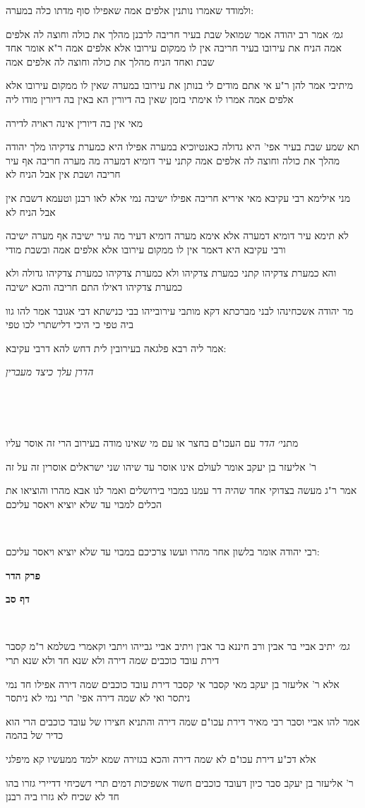 \documentclass[12pt, openany]{book}
\newcommand{\sethebfont}{
\fontsize{10.5pt}{21.0pt} \selectfont
}
\newcommand{\textblock}[1]{
{\sethebfont #1\\}	
}
\newcommand{\chapname}{}
\newcommand{\sectname}{}
\newcommand{\newchap}[1]{
	\addcontentsline{toc}{chapter}{#1}
	\renewcommand{\chapname}{#1}
		\begin{center}
			\textbf{%
\fontsize{16pt}{16pt}\selectfont
				#1}
		\end{center}
}
\newcommand{\newsection}[1]{
	\addcontentsline{toc}{section}{#1}
	\renewcommand{\sectname}{#1}	
	\vspace{-\baselineskip}
	\begin{center}
		\textbf{%
\fontsize{16pt}{16pt}\selectfont
			#1}
	\end{center}
	\vspace{-\baselineskip}
	\nopagebreak
}
\begin{document}
\textblock{ולמודד שאמרו נותנין אלפים אמה שאפילו סוף מדתו כלה במערה:}
\textblock{{\large\emph{גמ׳}} אמר רב יהודה אמר שמואל שבת בעיר חריבה לרבנן מהלך את כולה וחוצה לה אלפים אמה הניח את עירובו בעיר חריבה אין לו ממקום עירובו אלא אלפים אמה ר"א אומר אחד שבת ואחד הניח מהלך את כולה וחוצה לה אלפים אמה}
\textblock{מיתיבי אמר להן ר"ע אי אתם מודים לי בנותן את עירובו במערה שאין לו ממקום עירובו אלא אלפים אמה אמרו לו אימתי בזמן שאין בה דיורין הא באין בה דיורין מודו ליה}
\textblock{מאי אין בה דיורין אינה ראויה לדירה}
\textblock{תא שמע שבת בעיר אפי' היא גדולה כאנטיוכיא במערה אפילו היא כמערת צדקיהו מלך יהודה מהלך את כולה וחוצה לה אלפים אמה קתני עיר דומיא דמערה מה מערה חריבה אף עיר חריבה ושבת אין אבל הניח לא}
\textblock{מני אילימא רבי עקיבא מאי איריא חריבה אפילו ישיבה נמי אלא לאו רבנן וטעמא דשבת אין אבל הניח לא}
\textblock{לא תימא עיר דומיא דמערה אלא אימא מערה דומיא דעיר מה עיר ישיבה אף מערה ישיבה ורבי עקיבא היא דאמר אין לו ממקום עירובו אלא אלפים אמה ובשבת מודי}
\textblock{והא כמערת צדקיהו קתני כמערת צדקיהו ולא כמערת צדקיהו כמערת צדקיהו גדולה ולא כמערת צדקיהו דאילו התם חריבה והכא ישיבה}
\textblock{מר יהודה אשכחינהו לבני מברכתא דקא מותבי עירובייהו בבי כנישתא דבי אגובר אמר להו גוו ביה טפי כי היכי דלישתרי לכו טפי}
\textblock{אמר ליה רבא פלגאה בעירובין לית דחש להא דרבי עקיבא:}
\textblock{\par \par {\large\emph{הדרן עלך כיצד מעברין}}\par \par }
\textblock{}
\textblock{מתני׳ {\large\emph{הדר}} עם העכו"ם בחצר או עם מי שאינו מודה בעירוב הרי זה אוסר עליו}
\textblock{ר' אליעזר בן יעקב אומר לעולם אינו אוסר עד שיהו שני ישראלים אוסרין זה על זה}
\textblock{אמר ר"ג מעשה בצדוקי אחד שהיה דר עמנו במבוי בירושלים ואמר לנו אבא מהרו והוציאו את הכלים למבוי עד שלא יוציא ויאסר עליכם}
\textblock{}
\textblock{רבי יהודה אומר בלשון אחר מהרו ועשו צרכיכם במבוי עד שלא יוציא ויאסר עליכם:}
\newchap{פרק \quad הדר}
\newsection{דף סב}
\textblock{}
\textblock{{\large\emph{גמ׳}} יתיב אביי בר אבין ורב חיננא בר אבין ויתיב אביי גבייהו ויתבי וקאמרי בשלמא ר"מ קסבר דירת עובד כוכבים שמה דירה ולא שנא חד ולא שנא תרי}
\textblock{אלא ר' אליעזר בן יעקב מאי קסבר אי קסבר דירת עובד כוכבים שמה דירה אפילו חד נמי ניתסר ואי לא שמה דירה אפי' תרי נמי לא ניתסר}
\textblock{אמר להו אביי וסבר רבי מאיר דירת עכו"ם שמה דירה והתניא חצירו של עובד כוכבים הרי הוא כדיר של בהמה}
\textblock{אלא דכ"ע דירת עכו"ם לא שמה דירה והכא בגזירה שמא ילמד ממעשיו קא מיפלגי}
\textblock{ר' אליעזר בן יעקב סבר כיון דעובד כוכבים חשוד אשפיכות דמים תרי דשכיחי דדיירי גזרו בהו חד לא שכיח לא גזרו ביה רבנן}
\end{document}
